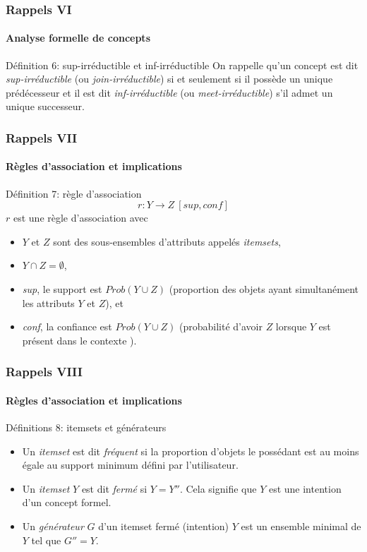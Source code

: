 \documentclass[french]{beamer}
\begin{document}
\begin{frame}
\frametitle{Rappels VI}
\framesubtitle{Analyse formelle de concepts}

\begin{block}{Définition 6: sup-irréductible et inf-irréductible}
On rappelle qu'un concept est dit \emph{sup-irréductible} (ou \emph{join-irréductible}) si et seulement si il possède un unique prédécesseur et il est dit \emph{inf-irréductible} (ou \emph{meet-irréductible}) s'il admet un unique successeur.
\end{block}
\end{frame}

\begin{frame}
\frametitle{Rappels VII}
\framesubtitle{Règles d'association et implications}
\begin{block}{Définition 7: règle d'association}
$$r : Y \rightarrow Z\ [sup, conf]$$
$r$ est une règle d'association avec
\begin{itemize}
\item $Y$ et $Z$ sont des sous-ensembles d'attributs appelés \textit{itemsets},
\item $Y \cap Z = \emptyset$,
\item \textit{sup}, le support est $Prob(Y \cup Z)$ (proportion des objets ayant simultanément les attributs $Y$ et $Z$), et
\item \textit{conf}, la confiance est $Prob(Y \cup Z)$ (probabilité d'avoir $Z$ lorsque $Y$ est présent dans le contexte \context).
\end{itemize}
\end{block}
\end{frame}

\begin{frame}
\frametitle{Rappels VIII}
\framesubtitle{Règles d'association et implications}
\begin{block}{Définitions 8: itemsets et générateurs}
\begin{itemize}
\item Un \emph{itemset} est dit \emph{fréquent} si la proportion d'objets le possédant est au moins égale au support minimum défini par l'utilisateur.
\item Un \emph{itemset} $Y$ est dit \emph{fermé} si $Y = Y''$. Cela signifie que $Y$ est une intention d'un concept formel.
\item Un \emph{générateur} $G$ \parencite{Pfaltz2002} d'un itemset fermé (intention) $Y$ est un ensemble minimal de  $Y$
tel que $G''= Y$. 
\end{itemize}
\end{block}
\end{frame}
\end{document}
